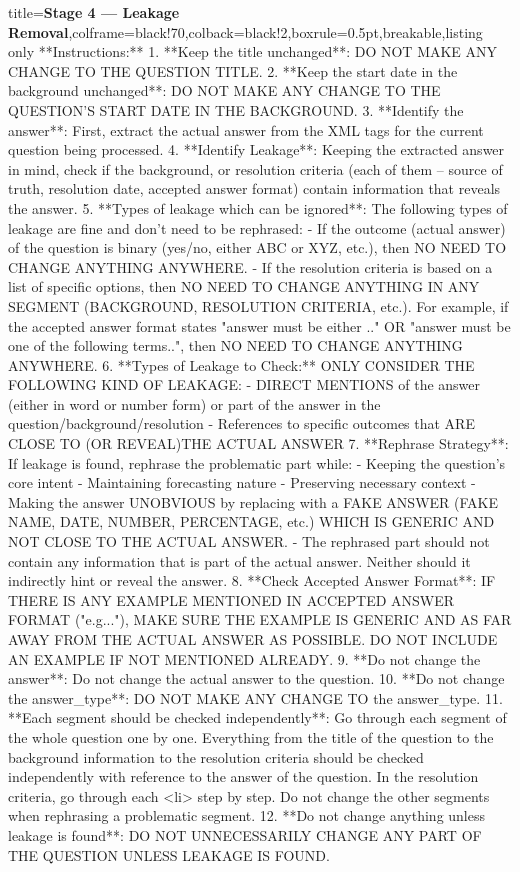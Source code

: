 \begin{tcblisting}{title={\textbf{Stage 4 --- Leakage Removal}},colframe=black!70,colback=black!2,boxrule=0.5pt,breakable,listing only}
**Instructions:**
1. **Keep the title unchanged**: DO NOT MAKE ANY CHANGE TO THE QUESTION TITLE.
2. **Keep the start date in the background unchanged**: DO NOT MAKE ANY CHANGE TO THE QUESTION'S START DATE IN THE BACKGROUND.
3. **Identify the answer**: First, extract the actual answer from the XML tags for the current question being processed.
4. **Identify Leakage**: Keeping the extracted answer in mind, check if the  background, or resolution criteria (each of them -- source of truth, resolution date, accepted answer format) contain information that reveals the answer.
5. **Types of leakage which can be ignored**: The following types of leakage are fine and don't need to be rephrased:
   - If the outcome (actual answer) of the question is binary (yes/no, either ABC or XYZ, etc.), then NO NEED TO CHANGE ANYTHING ANYWHERE.
   - If the resolution criteria is based on a list of specific options, then NO NEED TO CHANGE ANYTHING IN ANY SEGMENT (BACKGROUND, RESOLUTION CRITERIA, etc.). For example, if the accepted answer format states "answer must be either .." OR "answer must be one of the following terms..", then NO NEED TO CHANGE ANYTHING ANYWHERE.
6. **Types of Leakage to Check:** ONLY CONSIDER THE FOLLOWING KIND OF LEAKAGE:
   - DIRECT MENTIONS of the answer (either in word or number form) or part of the answer in the question/background/resolution
   - References to specific outcomes that ARE CLOSE TO (OR REVEAL)THE ACTUAL ANSWER
7. **Rephrase Strategy**: If leakage is found, rephrase the problematic part while:
   - Keeping the question's core intent
   - Maintaining forecasting nature
   - Preserving necessary context
   - Making the answer UNOBVIOUS by replacing with a FAKE ANSWER (FAKE NAME, DATE, NUMBER, PERCENTAGE, etc.) WHICH IS GENERIC AND NOT CLOSE TO THE ACTUAL ANSWER.
   - The rephrased part should not contain any information that is part of the actual answer. Neither should it indirectly hint or reveal the answer. 
8. **Check Accepted Answer Format**: IF THERE IS ANY EXAMPLE MENTIONED IN ACCEPTED ANSWER FORMAT ("e.g..."), MAKE SURE THE EXAMPLE IS GENERIC AND AS FAR AWAY FROM THE ACTUAL ANSWER AS POSSIBLE. DO NOT INCLUDE AN EXAMPLE IF NOT MENTIONED ALREADY. 
9. **Do not change the answer**: Do not change the actual answer to the question. 
10. **Do not change the answer_type**: DO NOT MAKE ANY CHANGE TO the answer_type.
11. **Each segment should be checked independently**: Go through each segment of the whole question one by one. Everything from the title of the question to the background information to the resolution criteria should be checked independently with reference to the answer of the question. In the resolution criteria, go through each <li> step by step. Do not change the other segments when rephrasing a problematic segment.
12. **Do not change anything unless leakage is found**: DO NOT UNNECESSARILY CHANGE ANY PART OF THE QUESTION UNLESS LEAKAGE IS FOUND.


\end{tcblisting}
